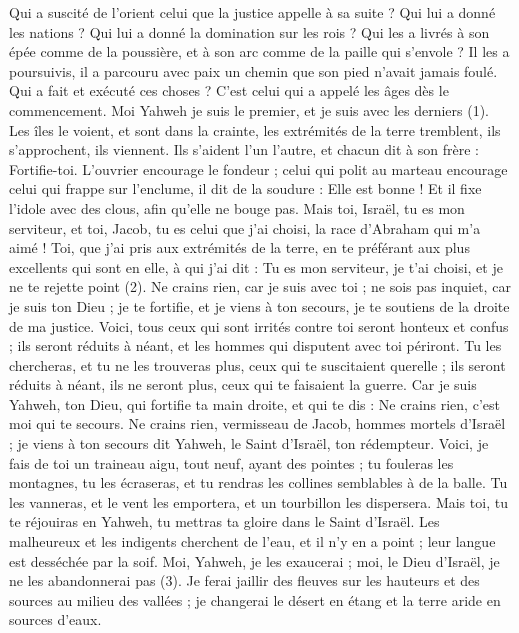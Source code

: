 \begin{multicols}{2}
Qui a suscité de l’orient celui que la justice appelle à sa suite ? Qui lui a donné les nations ? Qui lui a donné la domination sur les rois ? Qui les a livrés à son épée comme de la poussière, et à son arc comme de la paille qui s’envole ?
Il les a poursuivis, il a parcouru avec paix un chemin que son pied n’avait jamais foulé.
Qui a fait et exécuté ces choses ? C’est celui qui a appelé les âges dès le commencement. Moi Yahweh je suis le premier, et je suis avec les derniers (1).
Les îles le voient, et sont dans la crainte, les extrémités de la terre tremblent, ils s’approchent, ils viennent.
Ils s’aident l’un l’autre, et chacun dit à son frère : Fortifie-toi.
L'ouvrier encourage le fondeur ; celui qui polit au marteau encourage celui qui frappe sur l'enclume, il dit de la soudure : Elle est bonne ! Et il fixe l’idole avec des clous, afin qu’elle ne bouge pas.
Mais toi, Israël, tu es mon serviteur, et toi, Jacob, tu es celui que j'ai choisi, la race d'Abraham qui m'a aimé !
Toi, que j’ai pris aux extrémités de la terre, en te préférant aux plus excellents qui sont en elle, à qui j’ai dit : Tu es mon serviteur, je t'ai choisi, et je ne te rejette point (2).
Ne crains rien, car je suis avec toi ; ne sois pas inquiet, car je suis ton Dieu ; je te fortifie, et je viens à ton secours, je te soutiens de la droite de ma justice.
Voici, tous ceux qui sont irrités contre toi seront honteux et confus ; ils seront réduits à néant, et les hommes qui disputent avec toi périront.
Tu les chercheras, et tu ne les trouveras plus, ceux qui te suscitaient querelle ; ils seront réduits à néant, ils ne seront plus, ceux qui te faisaient la guerre.
Car je suis Yahweh, ton Dieu, qui fortifie ta main droite, et qui te dis : Ne crains rien, c'est moi qui te secours.
Ne crains rien, vermisseau de Jacob, hommes mortels d'Israël ; je viens à ton secours dit Yahweh, le Saint d'Israël, ton rédempteur.
Voici, je fais de toi un traineau aigu, tout neuf, ayant des pointes ; tu fouleras les montagnes, tu les écraseras, et tu rendras les collines semblables à de la balle.
Tu les vanneras, et le vent les emportera, et un tourbillon les dispersera. Mais toi, tu te réjouiras en Yahweh, tu mettras ta gloire dans le Saint d'Israël.
Les malheureux et les indigents cherchent de l’eau, et il n’y en a point ; leur langue est desséchée par la soif. Moi, Yahweh, je les exaucerai ; moi, le Dieu d'Israël, je ne les abandonnerai pas (3).
Je ferai jaillir des fleuves sur les hauteurs et des sources au milieu des vallées ; je changerai le désert en étang et la terre aride en sources d'eaux.

\end{multicols}
